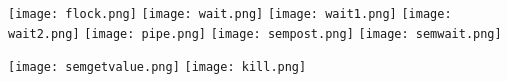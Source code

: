 \documentclass[12pt]{article}
\begin{document}
%
\newpage
\unsethebrew
\newpage
\texttt{[image: flock.png]}
\texttt{[image: wait.png]}
\texttt{[image: wait1.png]}
\texttt{[image: wait2.png]}
\texttt{[image: pipe.png]}
\texttt{[image: sempost.png]}
\texttt{[image: semwait.png]}
\quad \vspace{2Em}
\par\noindent
\texttt{[image: semgetvalue.png]}
\texttt{[image: kill.png]}
%
\end{document}
